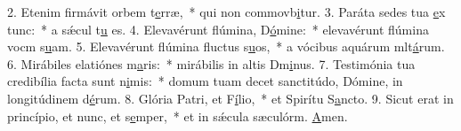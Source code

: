 2. Etenim firmávit orbem t\uline{e}rræ,~* qui non commovb\uline{i}tur.
3. Paráta sedes tua \uline{e}x tunc:~* a sǽcul t\uline{u} es.
4. Elevavérunt flúmina, D\uline{ó}mine:~* elevavérunt flúmina vocm s\uline{u}am.
5. Elevavérunt flúmina fluctus s\uline{u}os,~* a vócibus aquárum mlt\uline{á}rum.
6. Mirábiles elatiónes m\uline{a}ris:~* mirábilis in altis Dm\uline{i}nus.
7. Testimónia tua credibília facta sunt n\uline{i}mis:~* domum tuam decet sanctitúdo, Dómine, in longitúdinem d\uline{é}rum.
8. Glória Patri, et F\uline{í}lio,~* et Spirítu S\uline{a}ncto.
9. Sicut erat in princípio, et nunc, et s\uline{e}mper,~* et in sǽcula sæculórm. \uline{A}men.
